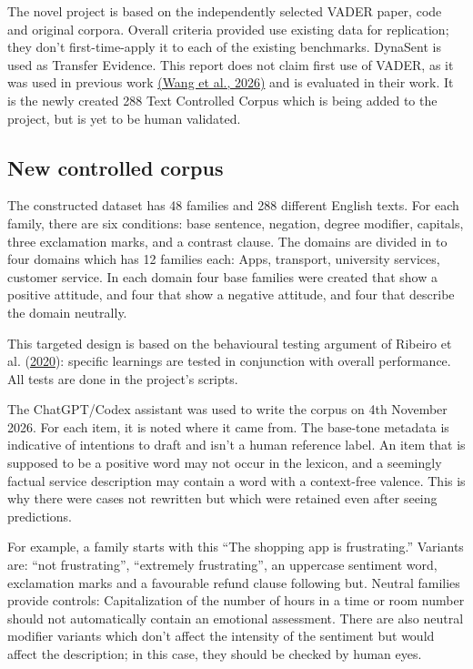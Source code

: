 \documentclass[11pt]{article}
\begin{document}
The novel project is based on the independently selected VADER paper, code and original corpora. Overall criteria provided use existing data for replication; they don't first-time-apply it to each of the existing benchmarks. DynaSent is used  as Transfer Evidence. This report does not claim first use of VADER, as it was used in previous work \hyperlink{ref_wang2026msra}{(Wang et al., 2026)} and is evaluated in their work. It is the newly created 288 Text Controlled Corpus which is being added to the project, but is yet to be human validated.


\subsection{New controlled corpus}

The constructed dataset has 48 families and 288 different English texts. For each family, there are six conditions: base sentence, negation, degree modifier, capitals, three exclamation marks, and a contrast clause. The domains are divided in to four domains which has 12 families each: Apps, transport, university services, customer service. In each domain four base families were created that show a positive attitude, and four that show a negative attitude, and four that describe the domain neutrally.


This targeted design is based on the behavioural testing argument of Ribeiro et al. (\hyperlink{ref_ribeiro2020checklist}{2020}): specific learnings are tested in conjunction with overall performance. All tests are done in the project's scripts.


The ChatGPT/Codex assistant was used to write the corpus on 4th November 2026. For each item, it is noted where it came from. The base-tone metadata is indicative of intentions to draft and isn't a human reference label. An item that is supposed to be a positive word may not occur in the lexicon, and a seemingly factual service description may contain a word with a context-free valence. This is why there were cases not rewritten but which were retained even after seeing predictions.


For example, a family starts with this ``The shopping app is frustrating.'' Variants are: ``not frustrating'', ``extremely frustrating'', an uppercase sentiment word, exclamation marks and a favourable refund clause following but. Neutral families provide controls: Capitalization of the number of hours in a time or room number should not automatically contain an emotional assessment. There are also neutral modifier variants which don't affect the intensity of the sentiment but would affect the description; in this case, they should be checked by human eyes.
\end{document}
